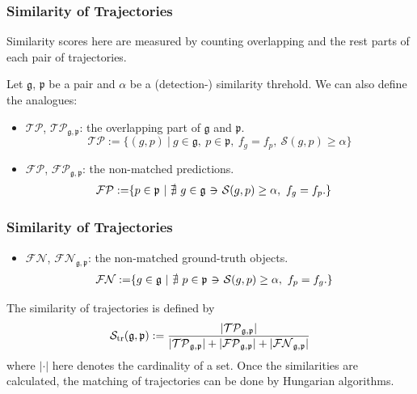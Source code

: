 \documentclass[slidetop, mathserif]{beamer}
\newcommand{\suchthat}{-\hspace{-10pt}\ni\hspace{-10pt}-}
\begin{document}
\begin{frame}
	\frametitle{Similarity of Trajectories}
	
	Similarity scores here are measured
	by counting overlapping and the rest parts of each pair of trajectories.
	
	\vspace{5pt}
	
	Let $\mathfrak g$, $\mathfrak p$ be a pair
	and $\alpha$ be a (detection-) similarity threhold.
	We can also define the analogues:
	\begin{itemize}
		\item $\mathcal{TP}$, $\mathcal{TP}_{\mathfrak g, \mathfrak p}$:
		      the overlapping part of $\mathfrak g$ and $\mathfrak p$.
		      \[
		      	\mathcal{TP} := \{(g,p)\ |\ 
		      	g\in\mathfrak g,~
		      	p\in\mathfrak p,~
		      	f_g=f_p,~ \mathcal S(g,p)\geq \alpha\}
		      \]
		\item $\mathcal{FP}$, $\mathcal{FP}_{\mathfrak g, \mathfrak p}$:
		      the non-matched predictions.
		      \begin{align*}
		      	\mathcal{FP} := & \{ p\in\mathfrak p\ |\ 
		      	\nexists\ g\in\mathfrak g ~\suchthat~ \mathcal S(g,p)\geq\alpha,~ f_g=f_p.\}
		      \end{align*}
	\end{itemize}
	
\end{frame}

\begin{frame}
	\frametitle{Similarity of Trajectories}
	
	\begin{itemize}
		\item $\mathcal{FN}$, $\mathcal{FN}_{\mathfrak g, \mathfrak p}$: the non-matched ground-truth objects.
		      \begin{align*}
		      	\mathcal{FN} := & \{ g\in\mathfrak g\ |\ 
		      	\nexists\ p\in\mathfrak p ~\suchthat~ \mathcal S(g,p)\geq\alpha,~ f_p=f_g.\}
		      \end{align*}
	\end{itemize}
	
	The similarity of trajectories is defined by
	\[
		\mathcal S_{\rm tr}(\mathfrak g, \mathfrak p) :=
		\dfrac{|\mathcal{TP}_{\mathfrak g,\mathfrak p}|}{
			|\mathcal{TP}_{\mathfrak g,\mathfrak p}|+|\mathcal{FP}_{\mathfrak g,\mathfrak p}|+|\mathcal{FN}_{\mathfrak g,\mathfrak p}|
		}
	\]
	where $|\cdot|$ here denotes the cardinality of a set.
	Once the similarities are calculated,
	the matching of trajectories can be done by Hungarian algorithms.
\end{frame}
\end{document}

